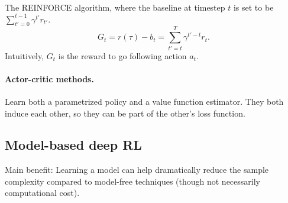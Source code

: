 \begin{algorithm}
  \begin{algorithmic}
      \Repeat
        \EndFor
    \EndFunction
  \end{algorithmic}
  \caption{The REINFORCE algorithm, where the baseline at timestep $t$ is set to
  be $\sum_{t'=0}^{t-1} \gamma^{t'}r_{t'}$. \[ G_t = r(\tau) - b_t =
  \sum_{t'=t}^T \gamma^{t'-t} r_t.\] Intuitively, $G_t$ is the reward to go
  following action $a_t$.}
\end{algorithm}

\paragraph{Actor-critic methods.}

Learn both a parametrized policy and a value function estimator. They both
induce each other, so they can be part of the other's loss function.

\subsection{Model-based deep RL}

Main benefit: Learning a model can help dramatically reduce the sample
complexity compared to model-free techniques (though not necessarily
computational cost).



